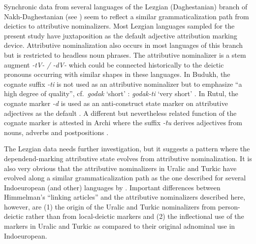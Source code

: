 {Synchronic data from several languages of the Lezgian (Daghestanian) branch of Nakh-Daghestanian (see ) seem to reflect a similar grammaticalization path from deictics to attributive nominalizers. Most Lezgian languages sampled for the present study have juxtaposition as the default adjective attribution marking device. Attributive nominalization also occurs in most languages of this branch but is restricted to headless noun phrases. The attributive nominalizer is a stem augment \textit{-tV- / -dV-} which could be connected historically to the deictic pronouns occurring with similar shapes in these languages. In Budukh, the cognate suffix \textit{-ti} is not used as an attributive nominalizer but to emphasize “a high degree of quality”, cf.~\textit{godak} ‘short’ : \textit{godak-ti} ‘very short’ \citep[267]{alekseev1994b}. In Rutul, the cognate marker \textit{-d} is used as an anti-construct state marker on attributive adjectives as the default \citep[224]{alekseev1994a}. A different but nevertheless related function of the cognate marker is attested in Archi where the suffix \textit{-t̄u} derives adjectives from nouns, adverbs and postpositions \citep[318]{kibrik1994b}.

The Lezgian data needs further investigation, but it suggests a pattern where the dependend-marking attributive state evolves from attributive nominalization. It is also very obvious that the attributive nominalizers in Uralic and Turkic have evolved along a similar grammaticalization path as the one described for several Indoeuropean (and other) languages by \cite{himmelmann1997}. Important differences between Himmelman's “linking articles” and the attributive nominalizers described here, however, are (1) the origin of the Uralic and Turkic nominalizers from person-deictic rather than from local-deictic markers and (2) the inflectional use of the markers in Uralic and Turkic as compared to their original adnominal use in Indoeuropean.

}
